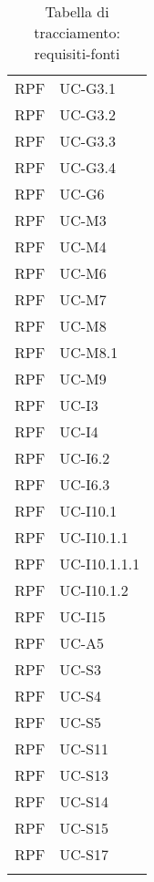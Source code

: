 \begin{longtable}{| p{5cm} | p{5cm} |}
		
		
		
		
		
		RPF & UC-G3.1\\
		\rowcolor{LightGray}
		RPF & UC-G3.2\\
		RPF & UC-G3.3\\
		RPF & UC-G3.4\\
		RPF & UC-G6\\
		
		RPF & UC-M3\\
		RPF & UC-M4\\
		RPF & UC-M6\\
		RPF & UC-M7\\
		RPF & UC-M8\\
		RPF & UC-M8.1\\
		\rowcolor{LightGray}
		RPF & UC-M9\\
		\rowcolor{LightGray}
		
		RPF & UC-I3\\
		\rowcolor{LightGray}
		RPF & UC-I4\\
		RPF & UC-I6.2\\
		\rowcolor{LightGray}
		RPF & UC-I6.3\\
		RPF & UC-I10.1\\
		RPF & UC-I10.1.1\\
		RPF & UC-I10.1.1.1\\
		RPF & UC-I10.1.2\\		
		RPF & UC-I15\\
		
		RPF & UC-A5\\
		
		RPF & UC-S3\\
		\rowcolor{LightGray}
		RPF & UC-S4\\
		RPF & UC-S5\\
		\rowcolor{LightGray}
		RPF & UC-S11\\
		RPF & UC-S13\\
		\rowcolor{LightGray}
		RPF & UC-S14\\	
		RPF & UC-S15\\
		RPF & UC-S17\\
		
		\hline
		\caption{Tabella di tracciamento: requisiti-fonti}
\end{longtable}

